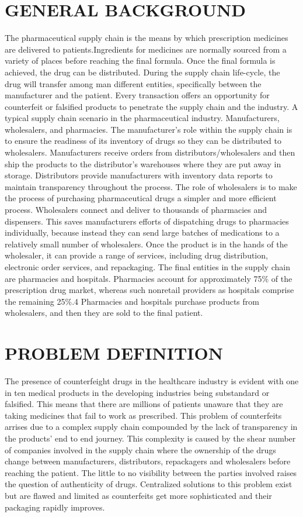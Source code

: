 \documentclass[12pt,a4paper]{report}
\begin{document}
\section{GENERAL BACKGROUND}
\hspace*{1cm}The pharmaceutical supply chain is the means by which prescription medicines are delivered to patients.Ingredients for medicines are normally sourced from a variety of places before reaching the final formula. Once the final formula is achieved, the drug can be distributed. During the supply chain life-cycle, the drug will transfer among man different entities, specifically between the manufacturer and the patient. Every transaction offers an opportunity for counterfeit or falsified products to penetrate the supply chain and the industry. A typical supply chain scenario in the pharmaceutical industry. Manufacturers, wholesalers, and pharmacies. The manufacturer’s role within the supply chain is to ensure the readiness of its inventory of drugs so they can be distributed to wholesalers. Manufacturers receive orders from distributors/wholesalers and then ship the products to the distributor’s warehouses where they are put away in storage. Distributors \cite{IEEEexample:book_typical} provide manufacturers with inventory data reports to maintain transparency throughout the process. The role of wholesalers is to make the process of purchasing pharmaceutical drugs a simpler and more efficient process. Wholesalers connect and deliver to thousands of pharmacies and dispensers. This saves manufacturers efforts of dispatching drugs to pharmacies individually, because instead they can send large batches of medications to a relatively small number of wholesalers. Once the product is in the hands of the wholesaler, it can provide a range of services, including drug distribution, electronic order services, and repackaging. 
The final entities in the supply chain are pharmacies and hospitals. Pharmacies account for approximately 75\% of the prescription drug market, whereas such nonretail providers as hospitals comprise the remaining 25\%.4 Pharmacies and hospitals purchase products from wholesalers, and then they are sold to the final patient.
\section{PROBLEM DEFINITION}
\hspace*{1cm}The presence of counterfeight drugs in the healthcare industry is evident with one in ten medical products in the developing industries being substandard or falsified. This means that there are millions of patients unaware that they are taking medicines that fail to work as prescribed. This problem of counterfeits arrises due to a complex supply chain compounded by the lack of transparency in the products’ end to end journey. This complexity is caused by the shear number of companies involved in the supply chain where the ownership of the drugs change between manufacturers, distributors, repackagers and wholesalers before reaching the patient. The little to no visibility between the parties involved raises the question of authenticity of drugs. Centralized solutions to this problem exist but are flawed and limited as counterfeits get more sophisticated and their packaging rapidly improves.
\end{document}
